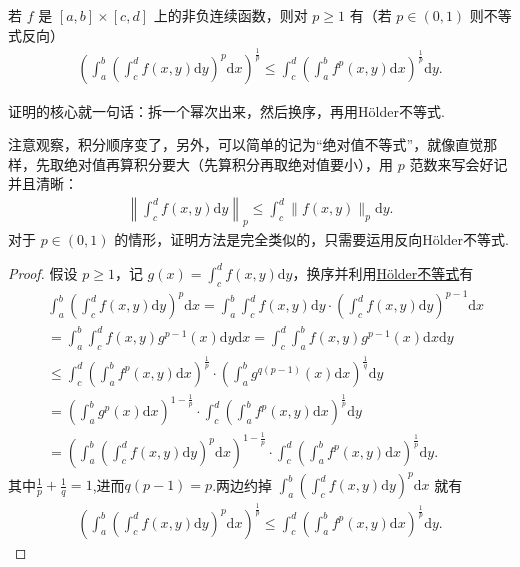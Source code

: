\documentclass[../../main.tex]{subfiles}%
\begin{document}
\begin{theorem}[Minkowski不等式]\label{theorem:Minkowski(闵可夫斯基)不等式}
若 $f$ 是 $[a,b] \times [c,d]$ 上的非负连续函数，则对 $p \geqslant 1$ 有（若 $p \in (0,1)$ 则不等式反向）
\begin{align*}
\left( \int_a^b \left( \int_c^d f(x,y) \mathrm{d}y \right)^p \mathrm{d}x \right)^{\frac{1}{p}} \leqslant \int_c^d \left( \int_a^b f^p(x,y) \mathrm{d}x \right)^{\frac{1}{p}} \mathrm{d}y.
\end{align*}
\end{theorem}
\begin{note}
证明的核心就一句话：拆一个幂次出来，然后换序，再用Hölder不等式.
\end{note}
\begin{remark}
注意观察，积分顺序变了，另外，可以简单的记为“绝对值不等式”，就像直觉那样，先取绝对值再算积分要大（先算积分再取绝对值要小），用 $p$ 范数来写会好记并且清晰：
\begin{align*}
\left\| \int_c^d f(x,y) \mathrm{d}y \right\|_p \leqslant  \int_c^d \|f(x,y)\|_p \mathrm{d}y.
\end{align*}
对于 $p \in (0,1)$ 的情形，证明方法是完全类似的，只需要运用反向Hölder不等式.
\end{remark}
\begin{proof}
假设 $p \geqslant  1$，记 $g(x) = \int_c^d f(x,y) \mathrm{d}y$，换序并利用\hyperref[theorem:Hölder(H\"older)不等式(积分形式)]{Hölder不等式}有
\begin{align*}
&\int_a^b \left( \int_c^d f(x,y) \mathrm{d}y \right)^p \mathrm{d}x = \int_a^b \int_c^d f(x,y) \mathrm{d}y \cdot \left( \int_c^d f(x,y) \mathrm{d}y \right)^{p-1} \mathrm{d}x
\\
&= \int_a^b \int_c^d f(x,y) g^{p-1}(x) \mathrm{d}y \mathrm{d}x = \int_c^d \int_a^b f(x,y) g^{p-1}(x) \mathrm{d}x \mathrm{d}y
\\
&\leqslant \int_c^d \left( \int_a^b f^p(x,y) \mathrm{d}x \right)^{\frac{1}{p}} \cdot \left( \int_a^b g^{q(p-1)}(x) \mathrm{d}x \right)^{\frac{1}{q}} \mathrm{d}y
\\
&= \left( \int_a^b g^p(x) \mathrm{d}x \right)^{1-\frac{1}{p}} \cdot \int_c^d \left( \int_a^b f^p(x,y) \mathrm{d}x \right)^{\frac{1}{p}} \mathrm{d}y
\\
&= \left( \int_a^b \left( \int_c^d f(x,y) \mathrm{d}y \right)^p \mathrm{d}x \right)^{1-\frac{1}{p}} \cdot \int_c^d \left( \int_a^b f^p(x,y) \mathrm{d}x \right)^{\frac{1}{p}} \mathrm{d}y.
\end{align*}
其中$\frac{1}{p}+\frac{1}{q}=1$,进而$q(p-1)=p$.两边约掉 $\int_a^b \left( \int_c^d f(x,y) \mathrm{d}y \right)^p \mathrm{d}x$ 就有
\begin{align*}
\left( \int_a^b \left( \int_c^d f(x,y) \mathrm{d}y \right)^p \mathrm{d}x \right)^{\frac{1}{p}} \leqslant \int_c^d \left( \int_a^b f^p(x,y) \mathrm{d}x \right)^{\frac{1}{p}} \mathrm{d}y.
\end{align*}
\end{proof}
\end{document}
